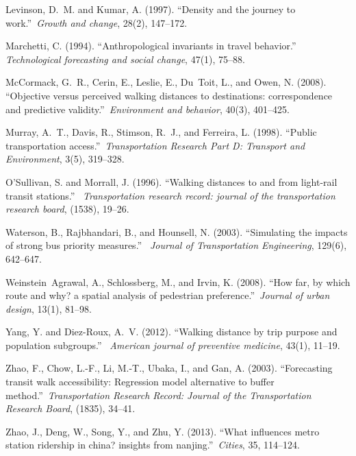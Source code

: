 \documentclass[sustainability,article,submit,moreauthors,pdftex,10pt,a4paper]{Definitions/mdpi}
\begin{document}
\begin{thebibliography}{999}
	Levinson, D.~M. and Kumar, A. (1997).
	\newblock ``Density and the journey to work.''\ {\em Growth and change}, 28(2),
	147--172.
	
	Marchetti, C. (1994).
	\newblock ``Anthropological invariants in travel behavior.''\ {\em
		Technological forecasting and social change}, 47(1), 75--88.
	
	McCormack, G.~R., Cerin, E., Leslie, E., Du~Toit, L., and Owen, N. (2008).
	\newblock ``Objective versus perceived walking distances to destinations:
	correspondence and predictive validity.''\ {\em Environment and behavior},
	40(3), 401--425.
	
	Murray, A.~T., Davis, R., Stimson, R.~J., and Ferreira, L. (1998).
	\newblock ``Public transportation access.''\ {\em Transportation Research Part
		D: Transport and Environment}, 3(5), 319--328.
	
	O'Sullivan, S. and Morrall, J. (1996).
	\newblock ``Walking distances to and from light-rail transit stations.''\ {\em
		Transportation research record: journal of the transportation research
		board}, (1538), 19--26.
	
	Waterson, B., Rajbhandari, B., and Hounsell, N. (2003).
	\newblock ``Simulating the impacts of strong bus priority measures.''\ {\em
		Journal of Transportation Engineering}, 129(6), 642--647.
	
	Weinstein~Agrawal, A., Schlossberg, M., and Irvin, K. (2008).
	\newblock ``How far, by which route and why? a spatial analysis of pedestrian
	preference.''\ {\em Journal of urban design}, 13(1), 81--98.
	
	Yang, Y. and Diez-Roux, A.~V. (2012).
	\newblock ``Walking distance by trip purpose and population subgroups.''\ {\em
		American journal of preventive medicine}, 43(1), 11--19.
	
	Zhao, F., Chow, L.-F., Li, M.-T., Ubaka, I., and Gan, A. (2003).
	\newblock ``Forecasting transit walk accessibility: Regression model
	alternative to buffer method.''\ {\em Transportation Research Record: Journal
		of the Transportation Research Board}, (1835), 34--41.
	
	Zhao, J., Deng, W., Song, Y., and Zhu, Y. (2013).
	\newblock ``What influences metro station ridership in china? insights from
	nanjing.''\ {\em Cities}, 35, 114--124.
	
\end{thebibliography}
\end{document}
